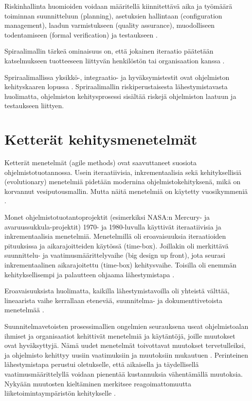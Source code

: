 \documentclass[finnish]{tktltiki2}
\theoremstyle{definition}
\theoremstyle{remark}
\begin{document}
Riskinhallinta huomioiden voidaan määritellä kiinnitettävä aika ja työmäärä toiminnan suunnitteluun (planning), asetuksien hallintaan (configuration management), laadun varmistukseen (quality assurance), muodolliseen todentamiseen (formal verification) ja testaukseen \cite{BOE88}.

Spiraalimallin tärkeä ominaisuus on, että jokainen iteraatio päätetään katselmukseen tuotteeseen liittyvän henkilöstön tai organisaation kanssa \cite{BOE88}.

Spriraalimallissa yksikkö-, integraatio- ja hyväksymis\-testit ovat ohjelmiston kehityskaaren lopussa \cite{BOE88}. Spriraalimallin riskiperustaisesta lähestymistavasta huolimatta, ohjelmiston kehitysprosessi sisältää riskejä ohjelmiston laatuun ja testaukseen liittyen. 

\section{Ketterät kehitysmenetelmät}

Ketterät menetelmät (agile methods) ovat saavuttaneet suosiota ohjelmistotuotannossa. Usein iteraatiivisia, inkrementaalisia sekä kehityksellisiä (evolutionary) menetelmiä pidetään modernina ohjelmistokehityksenä, mikä on korvannut vesiputousmallin. Mutta näitä menetelmiä on käytetty vuosikymmeniä \cite{LAB03}.

Monet ohjelmistotuotantoprojektit  (esimerkiksi NASA:n Mercury- ja avaruussukkula-projektit) 1970- ja 1980-luvulla käyttivät iteraatiivisia ja inkrementaalisia menetelmiä.  Menetelmillä oli eroavaisuuksia iteraatioiden pituuksissa ja aikarajoitteiden käytössä (time-box). Joillakin oli merkittävä suunnittelu- ja vaatimusmäärittelyvaihe (big design up front), jota seurasi inkrementaalinen aikarajoitettu (time-box) kehitysvaihe. Toisilla oli enemmän kehityksellisempi ja palautteen ohjaama lähestymistapa \cite{LAB03}.

Eroavaisuuksista huolimatta, kaikilla lähestymistavoilla oli yhteistä välttää, lineaarista vaihe kerrallaan etenevää, suunnitelma- ja dokumenttivetoista menetelmää \cite{LAB03}.

Suunnitelmavetoisten prosessimallien ongelmien seurauksena useat ohjelmistoalan ihmiset ja organisaatiot kehittivät menetelmiä ja käytäntöjä, joille muutokset ovat hyväksyttyjä. Nämä uudet menetelmät toivottavat muutokset tervetulleiksi, ja ohjelmisto kehittyy uusiin vaatimuksiin ja muutoksiin mukautuen \cite{WIC03}. Perinteinen lähestymistapa perustui oletukselle, että aikaisella ja täydellisellä vaatimusmäärittelyllä voidaan pienentää kustannuksia vähentämällä muutoksia. Nykyään muutosten kieltäminen merkitsee reagoimattomuutta liiketoimintaympäristön kehitykselle \cite{HIC01}.
\end{document}

